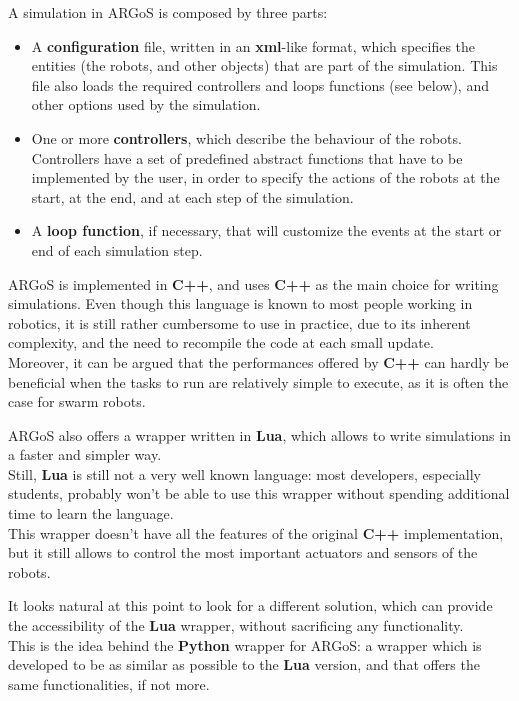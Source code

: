 \documentclass[
12pt,
a4paper,
oneside,
headinclude,
footinclude]{article}
\theoremstyle{definition} %
\begin{document}
A simulation in ARGoS is composed by three parts: 
\begin{itemize}
    \item A \textbf{configuration} file, written in an \textbf{xml}-like format, which specifies the entities (the robots, and other objects) that are part of the simulation. This file also loads the required controllers and loops functions (see below), and other options used by the simulation.
    \item One or more \textbf{controllers}, which describe the behaviour of the robots. Controllers have a set of predefined abstract functions that have to be implemented by the user, in order to specify the actions of the robots at the start, at the end, and at each step of the simulation.
    \item A \textbf{loop function}, if necessary, that will customize the events at the start or end of each simulation step.
\end{itemize}

ARGoS is implemented in \textbf{C++}, and uses \textbf{C++} as the main choice for writing simulations. Even though this language is known to most people working in robotics, it is still rather cumbersome to use in practice, due to its inherent complexity, and the need to recompile the code at each small update.\\
Moreover, it can be argued that the performances offered by \textbf{C++} can hardly be beneficial when the tasks to run are relatively simple to execute, as it is often the case for swarm robots.

ARGoS also offers a wrapper written in \textbf{Lua}, which allows to write simulations in a faster and simpler way. \\
Still, \textbf{Lua} is still not a very well known language: most developers, especially students, probably won't be able to use this wrapper without spending additional time to learn the language.\\
This wrapper doesn't have all the features of the original \textbf{C++} implementation, but it still allows to control the most important actuators and sensors of the robots.

It looks natural at this point to look for a different solution, which can provide the accessibility of the \textbf{Lua} wrapper, without sacrificing any functionality.\\
This is the idea behind the \textbf{Python} wrapper for ARGoS: a wrapper which is developed to be as similar as possible to the \textbf{Lua} version, and that offers the same functionalities, if not more.
\end{document}
